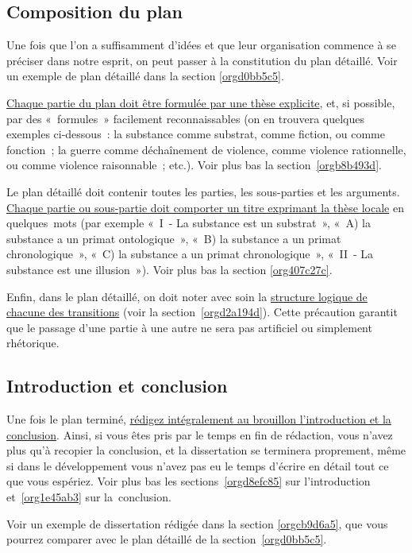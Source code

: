 \documentclass[a4paper,12pt]{article}
\begin{document}
\subsection{Composition du plan}
\label{sec:org50e6a01}

Une fois que l'on a suffisamment d'idées et que leur organisation
commence à se préciser dans notre esprit, on peut passer à la
constitution du plan détaillé. Voir un exemple de plan détaillé dans la
section \ref{orgd0bb5c5}.

\uline{Chaque partie du plan doit être formulée par une thèse explicite}, et,
si possible, par des « formules » facilement reconnaissables (on en
trouvera quelques exemples ci-dessous : la substance comme substrat,
comme fiction, ou comme fonction ; la guerre comme déchaînement de
violence, comme violence rationnelle, ou comme violence raisonnable ;
etc.). Voir plus bas la section \ref{orgb8b493d}.

Le plan détaillé doit contenir toutes les parties, les sous-parties et
les arguments. \uline{Chaque partie ou sous-partie doit comporter un titre
exprimant la thèse locale} en quelques mots (par exemple « I - La
substance est un substrat », « A) la substance a un primat
ontologique », « B) la substance a un primat chronologique », « C) la
substance a un primat chronologique », « II - La substance est une
illusion »). Voir plus bas la section \ref{org407c27c}.

Enfin, dans le plan détaillé, on doit noter avec soin la \uline{structure
logique de chacune des transitions} (voir la section \ref{orgd2a194d}). Cette
précaution garantit que le passage d'une partie à une autre ne sera pas
artificiel ou simplement rhétorique.

\subsection{Introduction et conclusion}
\label{sec:orgf6b29c6}

Une fois le plan terminé, \uline{rédigez intégralement au brouillon
l'introduction et la conclusion}. Ainsi, si vous êtes pris par le temps
en fin de rédaction, vous n'avez plus qu'à recopier la conclusion, et la
dissertation se terminera proprement, même si dans le développement vous
n'avez pas eu le temps d'écrire en détail tout ce que vous espériez.
Voir plus bas les sections \ref{orgd8efc85} sur l'introduction et \ref{org1e45ab3}
sur la conclusion.

Voir un exemple de dissertation rédigée dans la section \ref{orgcb9d6a5}, que
vous pourrez comparer avec le plan détaillé de la section \ref{orgd0bb5c5}.
\end{document}
